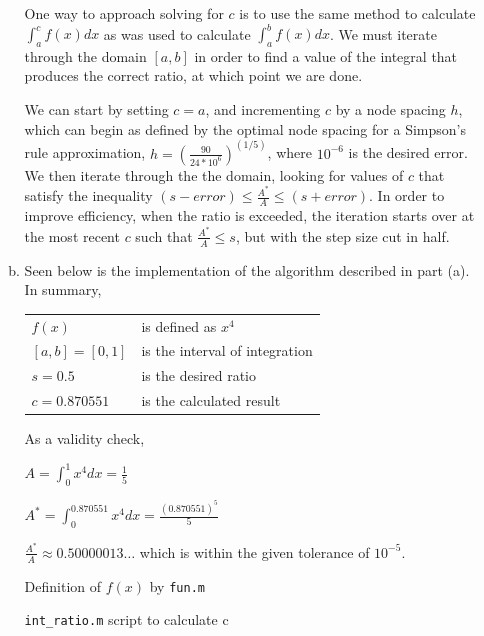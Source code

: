 \documentclass[11pt]{article}
\begin{document}
\begin{enumerate}
\begin{enumerate}[(a)]
		\medskip

		One way to approach solving for $c$ is to use the same method to calculate $\int_{a}^{c}f(x)dx$ as was used to calculate $\int_{a}^{b}f(x)dx$. We must iterate through the domain $[a,b]$ in order to find a value of the integral that produces the correct ratio, at which point we are done.

		\medskip

		We can start by setting $c=a$, and incrementing $c$ by a node spacing $h$, which can begin as defined by the optimal node spacing for a Simpson's rule approximation, $h = (\frac{90}{24*10^6})^(1/5)$, where $10^{-6}$ is the desired error. We then iterate through the the domain, looking for values of $c$ that satisfy the inequality $(s - error) \leq \frac{A^*}{A} \leq (s + error)$. In order to improve efficiency, when the ratio is exceeded, the iteration starts over at the most recent $c$ such that $\frac{A^*}{A} \leq s$, but with the step size cut in half.

		\medskip

		\item Seen below is the implementation of the algorithm described in part (a). In summary,
		\begin{center}
		\begin{tabular}{ll}
		$f(x)$ & is defined as $x^4$ \\
		$[a,b] = [0,1]$ & is the interval of integration \\
		$s = 0.5$ & is the desired ratio \\
		$c = 0.870551$ & is the calculated result \\
		\end{tabular}
		\end{center}

		\medskip

		As a validity check,

		$A = \int_{0}^{1}x^4dx = \frac{1}{5}$

		$A^* = \int_{0}^{0.870551}x^4dx = \frac{(0.870551)^5}{5}$

		$\frac{A^*}{A} \approx 0.50000013\ldots$ which is within the given tolerance of $10^{-5}$.

		\medskip

		\begin{center}
		Definition of $f(x)$ by \texttt{fun.m}
		\end{center}
		

		\medskip

		\begin{center}
		\texttt{int\_ratio.m} script to calculate c
		\end{center}
		


\end{enumerate}
\end{enumerate}
\end{document}
